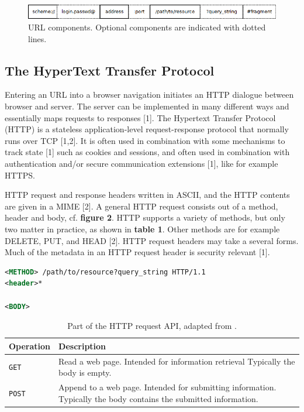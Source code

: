 \begin{figure}
	\begin{center}		
		\includegraphics[width=0.7\columnwidth]{img/security/url-components}
		\caption{URL components. Optional components are indicated with dotted lines.}
		\label{fig:url-components}
	\end{center}
\end{figure}





\subsection{The HyperText Transfer Protocol}

Entering an URL into a browser navigation initiates an HTTP dialogue between browser and server. The server can be implemented in many different ways and essentially maps requests to responses [1]. The Hypertext Transfer Protocol (HTTP) is a stateless application-level request-response protocol that normally runs over TCP [1,2]. It is often used in combination with some mechanisms to track state [1] such as cookies and sessions, and often used in combination with authentication and/or secure communication extensions [1], like for example HTTPS.

HTTP request and response headers written in ASCII, and the HTTP contents are given in a MIME [2]. A general HTTP request consists out of a method, header and body, cf. \textbf{figure 2}. HTTP supports a variety of methods, but only two matter in practice, as shown in \textbf{table 1}. Other methods are for example DELETE, PUT, and HEAD [2]. HTTP request headers may take a several forms. Much of the metadata in an HTTP request header is security relevant [1].

\begin{lstlisting}[language=xml, caption=HTTP request., label=listing:http-request]
<METHOD> /path/to/resource?query_string HTTP/1.1
<header>*

<BODY>
\end{lstlisting}


\begin{table}[H]
	\caption{Part of the HTTP request API, adapted from \cite{Tanenbaum:2002:CN:572404}.}
	\label{tab:api:collections}
	\begin{tabular}{p{150px} | p{250px}}
		\textbf{Operation} & \textbf{Description} \\
		\hline
		\texttt{GET} 	& Read a web page. Intended for information retrieval Typically the body is empty. \\
		\texttt{POST} 	& Append to a web page. Intended for submitting information. Typically the body contains the submitted information. \\
		\hline
	\end{tabular}
\end{table}


